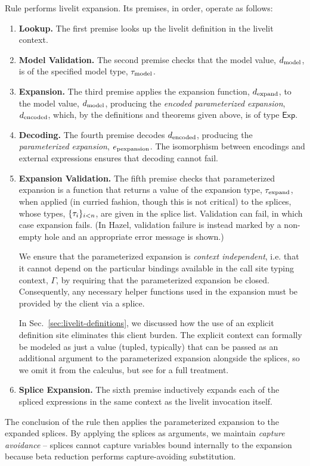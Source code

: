 Rule  performs livelit expansion. Its premises, in order, operate as follows:
\begin{enumerate}[itemsep=3px,leftmargin=*]
    \item \textbf{Lookup.} The first premise looks up the livelit definition in the livelit context.
    \item \textbf{Model Validation.} The second premise checks that the model value, $d_\text{model}$, is of the
    specified model type, $\tau_\text{model}$.
    \item \textbf{Expansion.} The third premise applies the expansion function, $d_\text{expand}$, to the model value, $d_\text{model}$,
    producing the \emph{encoded parameterized expansion}, $d_\text{encoded}$, which, by the definitions and theorems given above, is of type $\mathsf{Exp}$.
    \item \textbf{Decoding.} The fourth premise decodes $d_\text{encoded}$, producing the \emph{parameterized expansion}, $e_\text{pexpansion}$. The isomorphism between encodings and external expressions ensures that decoding cannot fail.
    \item \textbf{Expansion Validation.} The fifth premise checks that {parameterized expansion} is a function that returns a value of the expansion type, $\tau_\text{expand}$, when applied (in curried fashion, though this is not critical)
    to the splices, whose types, $\{\tau_i\}_{i < n}$, are given in the splice list.
    Validation can fail, in which case expansion fails. (In Hazel, validation failure is instead marked by a non-empty hole and an appropriate error message is shown.)
    
    We ensure that the parameterized expansion is \emph{context independent},
    i.e. that it cannot depend on the particular bindings available in the call site typing context, $\Gamma$, 
     by
    requiring that the parameterized expansion be
    closed. Consequently, any necessary helper functions used in the expansion must be provided by the client
    via a splice. 

    In Sec.~\ref{sec:livelit-definitions}, we discussed how the use of an explicit definition site  eliminates this client burden.
    The explicit context can formally be modeled as just a value (tupled, typically) that can be passed as an additional argument to the parameterized expansion alongside the splices, 
    so we omit it from the calculus, but see \cite{TLMs} for a full treatment.
    
    \item \textbf{Splice Expansion.} The sixth premise inductively expands each of the spliced expressions in the same context as the livelit
    invocation itself.
\end{enumerate}
The conclusion of the rule then applies the parameterized expansion to the expanded splices.
By applying the splices as arguments, we maintain \emph{capture avoidance} -- splices cannot capture variables
bound internally to the expansion because beta reduction performs capture-avoiding substitution. 

